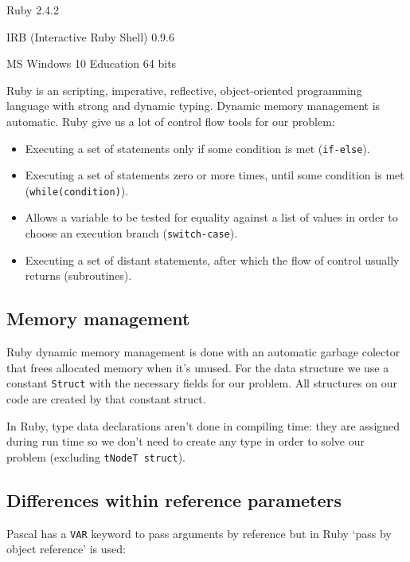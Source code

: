 \documentclass[11pt]{scrartcl} %
\begin{document}
\begin{description}[align=left,labelwidth=10em]
\item [Language Version] Ruby 2.4.2
\item [Interpreter] IRB (Interactive Ruby Shell) 0.9.6
\item [Operating System] MS Windows 10 Education 64 bits
\end{description}

Ruby is an scripting, imperative, reflective, object-oriented programming language with strong and dynamic typing. Dynamic memory management is automatic. Ruby give us a lot of control flow tools for our problem:

\begin{itemize}  
\item Executing a set of statements only if some condition is met (\texttt{if-else}).
\item Executing a set of statements zero or more times, until some condition is met (\texttt{while(condition)}). 
\item Allows a variable to be tested for equality against a list of values in order to choose an execution branch (\texttt{switch-case}).
\item Executing a set of distant statements, after which the flow of control usually returns (subroutines).
\end{itemize}

\subsection*{Memory management}

Ruby dynamic memory management is done with an automatic garbage colector that frees allocated memory when it's unused. For the data structure we use a constant \texttt{Struct} with the necessary fields for our problem. All structures on our code are created by that constant struct.

In Ruby, type data declarations aren't done in compiling time: they are assigned during run time so we don't need to create any type in order to solve our problem (excluding \texttt{tNodeT struct}).

\subsection*{Differences within reference parameters}

Pascal has a \texttt{VAR} keyword to pass arguments by reference but in Ruby `pass by object reference' is used:
\end{document}
